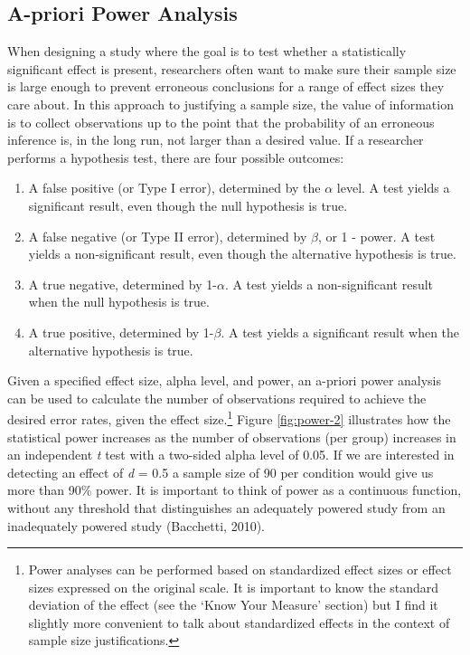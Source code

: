 \documentclass[
  english,
  ,jou, a4paper,floatsintext]{apa6}
\providecommand{\tightlist}{%
  \setlength{\itemsep}{0pt}\setlength{\parskip}{0pt}}
\begin{document}
\hypertarget{a-priori-power-analysis}{%
\subsection{A-priori Power Analysis}\label{a-priori-power-analysis}}

When designing a study where the goal is to test whether a statistically significant effect is present, researchers often want to make sure their sample size is large enough to prevent erroneous conclusions for a range of effect sizes they care about. In this approach to justifying a sample size, the value of information is to collect observations up to the point that the probability of an erroneous inference is, in the long run, not larger than a desired value. If a researcher performs a hypothesis test, there are four possible outcomes:

\begin{enumerate}
\def\labelenumi{\arabic{enumi}.}
\tightlist
\item
  A false positive (or Type I error), determined by the \(\alpha\) level. A test yields a significant result, even though the null hypothesis is true.
\item
  A false negative (or Type II error), determined by \(\beta\), or 1 - power. A test yields a non-significant result, even though the alternative hypothesis is true.
\item
  A true negative, determined by 1-\(\alpha\). A test yields a non-significant result when the null hypothesis is true.
\item
  A true positive, determined by 1-\(\beta\). A test yields a significant result when the alternative hypothesis is true.
\end{enumerate}

Given a specified effect size, alpha level, and power, an a-priori power analysis can be used to calculate the number of observations required to achieve the desired error rates, given the effect size.\footnote{Power analyses can be performed based on standardized effect sizes or effect sizes expressed on the original scale. It is important to know the standard deviation of the effect (see the `Know Your Measure' section) but I find it slightly more convenient to talk about standardized effects in the context of sample size justifications.} Figure \ref{fig:power-2} illustrates how the statistical power increases as the number of observations (per group) increases in an independent \emph{t} test with a two-sided alpha level of 0.05. If we are interested in detecting an effect of \emph{d} = 0.5 a sample size of 90 per condition would give us more than 90\% power. It is important to think of power as a continuous function, without any threshold that distinguishes an adequately powered study from an inadequately powered study (Bacchetti, 2010).
\end{document}
